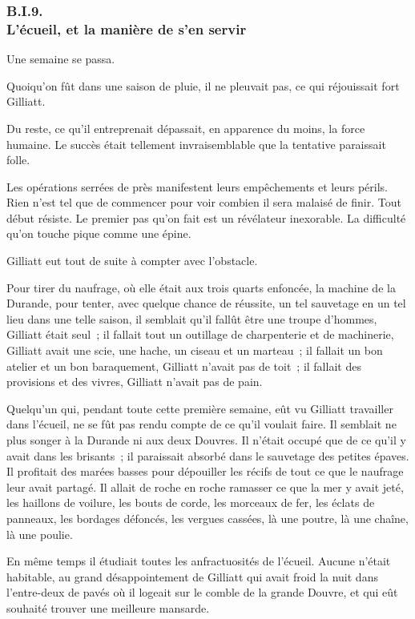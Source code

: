 \documentclass[french,twoside]{book} %
\begin{document}
 \subsubsection[{B.I.9. L’écueil, et la manière de s’en servir}]{B.I.9. \\
L’écueil, et la manière de s’en servir}
\noindent Une semaine se passa.\par
Quoiqu’on fût dans une saison de pluie, il ne pleuvait pas, ce qui réjouissait fort Gilliatt.\par
Du reste, ce qu’il entreprenait dépassait, en apparence du moins, la force humaine. Le succès était tellement invraisemblable que la tentative paraissait folle.\par
Les opérations serrées de près manifestent leurs empêchements et leurs périls. Rien n’est tel que de commencer pour voir combien il sera malaisé de finir. Tout début résiste. Le premier pas qu’on fait est un révélateur inexorable. La difficulté qu’on touche pique comme une épine.\par
Gilliatt eut tout de suite à compter avec l’obstacle.\par
Pour tirer du naufrage, où elle était aux trois quarts enfoncée, la machine de la Durande, pour tenter, avec quelque chance de réussite, un tel sauvetage en un tel lieu dans une telle saison, il semblait qu’il fallût être une troupe d’hommes, Gilliatt était seul ; il fallait  tout un outillage de charpenterie et de machinerie, Gilliatt avait une scie, une hache, un ciseau et un marteau ; il fallait un bon atelier et un bon baraquement, Gilliatt n’avait pas de toit ; il fallait des provisions et des vivres, Gilliatt n’avait pas de pain.\par
Quelqu’un qui, pendant toute cette première semaine, eût vu Gilliatt travailler dans l’écueil, ne se fût pas rendu compte de ce qu’il voulait faire. Il semblait ne plus songer à la Durande ni aux deux Douvres. Il n’était occupé que de ce qu’il y avait dans les brisants ; il paraissait absorbé dans le sauvetage des petites épaves. Il profitait des marées basses pour dépouiller les récifs de tout ce que le naufrage leur avait partagé. Il allait de roche en roche ramasser ce que la mer y avait jeté, les haillons de voilure, les bouts de corde, les morceaux de fer, les éclats de panneaux, les bordages défoncés, les vergues cassées, là une poutre, là une chaîne, là une poulie.\par
En même temps il étudiait toutes les anfractuosités de l’écueil. Aucune n’était habitable, au grand désappointement de Gilliatt qui avait froid la nuit dans l’entre-deux de pavés où il logeait sur le comble de la grande Douvre, et qui eût souhaité trouver une meilleure mansarde.\par
\end{document}
